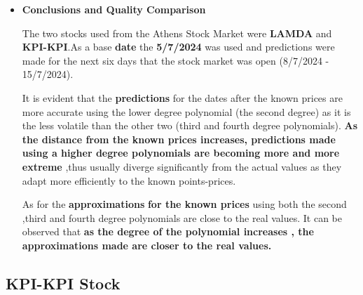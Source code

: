 \documentclass{article}
\begin{document}
\begin{itemize}
    \item \textbf{Conclusions and Quality Comparison}
    
    The two stocks used from the Athens Stock Market were\textbf{ LAMDA} and      \textbf{KPI-KPI}.As a base \textbf{date} the \textbf{5/7/2024} was used and predictions were made for the next six days that the stock market was open (8/7/2024 - 15/7/2024).

    It is evident that the \textbf{predictions} for the dates after the known prices are more accurate using the lower degree polynomial (the second degree) as it is the less volatile than the other two (third and fourth degree polynomials).
    \textbf{As the distance from the known prices increases, predictions made using a higher degree polynomials are becoming more and more extreme} ,thus usually diverge significantly from the actual values as they adapt more efficiently to the known points-prices.

    
    As for the \textbf{approximations} \textbf{for the known prices} using both the second ,third and fourth degree polynomials are close to the real values. It can be observed that \textbf{as the degree of the polynomial increases , the approximations made are closer to the real values.}

    
    

\end{itemize}

\newpage
\subsection{KPI-KPI Stock}
\end{document}
